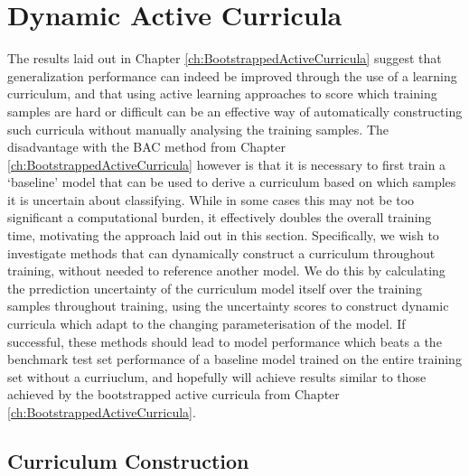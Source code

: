 \chapter{Dynamic Active Curricula}\label{ch:DAC}
The results laid out in Chapter \ref{ch:BootstrappedActiveCurricula} suggest that generalization performance can indeed be improved through the use of a learning curriculum, and that using active learning approaches to score which training samples are hard or difficult can be an effective way of automatically constructing such curricula without manually analysing the training samples. The disadvantage with the BAC method from Chapter \ref{ch:BootstrappedActiveCurricula} however is that it is necessary to first train a `baseline' model that can be used to derive a curriculum based on which samples it is uncertain about classifying. While in some cases this may not be too significant a computational burden, it effectively doubles the overall training time, motivating the approach laid out in this section. Specifically, we wish to investigate methods that can dynamically construct a curriculum throughout training, without needed to reference another model. We do this by calculating the prrediction uncertainty of the curriculum model itself over the training samples throughout training, using the uncertainty scores to construct dynamic curricula which adapt to the changing parameterisation of the model. If successful, these methods should lead to model performance which beats a the benchmark test set performance of a baseline model trained on the entire training set without a curriuclum, and hopefully will achieve results similar to those achieved by the bootstrapped active curricula from Chapter \ref{ch:BootstrappedActiveCurricula}.
\section{Curriculum Construction}
